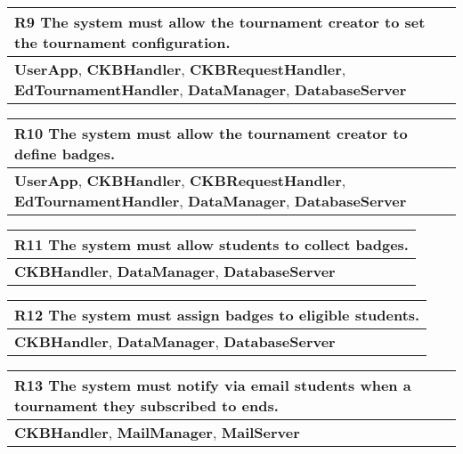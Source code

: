 \begin{table}[H]
    \begin{tabularx}{\textwidth}{X}
        \toprule
        \textbf{R9} The system must allow the tournament creator to set the tournament configuration. \\ \midrule
        \textbf{UserApp}, \textbf{CKBHandler}, \textbf{CKBRequestHandler}, \textbf{EdTournamentHandler}, \textbf{DataManager}, \textbf{DatabaseServer} \\
    \end{tabularx}
\end{table}

\begin{table}[H]
    \begin{tabularx}{\textwidth}{X}
        \toprule
        \textbf{R10} The system must allow the tournament creator to define badges. \\ \midrule
        \textbf{UserApp}, \textbf{CKBHandler}, \textbf{CKBRequestHandler}, \textbf{EdTournamentHandler}, \textbf{DataManager}, \textbf{DatabaseServer}                    \\
    \end{tabularx}
\end{table}

\begin{table}[H]
    \begin{tabularx}{\textwidth}{X}
        \toprule
        \textbf{R11} The system must allow students to collect badges.  \\ \midrule
        \textbf{CKBHandler}, \textbf{DataManager}, \textbf{DatabaseServer}                     \\
    \end{tabularx}
\end{table}

\begin{table}[H]
    \begin{tabularx}{\textwidth}{X}
        \toprule
        \textbf{R12} The system must assign badges to eligible students. \\ \midrule
        \textbf{CKBHandler}, \textbf{DataManager}, \textbf{DatabaseServer}                     \\
    \end{tabularx}
\end{table}

\begin{table}[H]
    \begin{tabularx}{\textwidth}{X}
        \toprule
        \textbf{R13} The system must notify via email students when a tournament they subscribed to ends. \\ \midrule
        \textbf{CKBHandler}, \textbf{MailManager}, \textbf{MailServer}             \\
    \end{tabularx}
\end{table}


